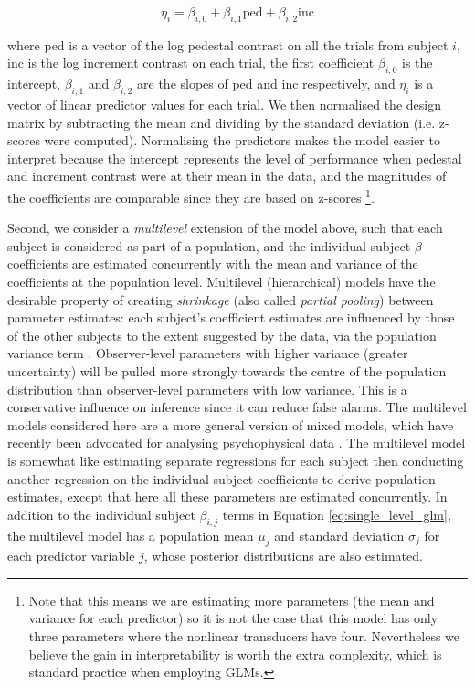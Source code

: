 \documentclass[11pt,a4paper]{article}
\begin{document}
\begin{equation}
\label{eq:single_level_glm}
\eta_{i} = \beta_{i,0} + \beta_{i,1} \mathrm{ped} + \beta_{i,2} \mathrm{inc}
\end{equation}

where ped is a vector of the log pedestal contrast on all the trials from subject $i$, inc is the log increment contrast on each trial, the first coefficient $\beta_{i,0}$ is the intercept, $\beta_{i,1}$ and $\beta_{i,2}$ are the slopes of ped and inc respectively,  and $\eta_{i}$ is a vector of linear predictor values for each trial.
We then normalised the design matrix by subtracting the mean and dividing by the standard deviation (i.e. z-scores were computed).
Normalising the predictors makes the model easier to interpret because the intercept represents the level of performance when pedestal and increment contrast were at their mean in the data, and the magnitudes of the coefficients are comparable since they are based on z-scores
\footnote{Note that this means we are estimating more parameters (the mean and variance for each predictor) so it is not the case that this model has only three parameters where the nonlinear transducers have four. Nevertheless we believe the gain in interpretability is worth the extra complexity, which is standard practice when employing GLMs.}.

Second, we consider a \textit{multilevel} extension of the model above, such that each subject is considered as part of a population, and the individual subject $\beta$ coefficients are estimated concurrently with the mean and variance of the coefficients at the population level.
Multilevel (hierarchical) models have the desirable property of creating \textit{shrinkage} (also called \textit{partial pooling}) between parameter estimates: each subject's coefficient estimates are influenced by those of the other subjects to the extent suggested by the data, via the population variance term \citep{Gelman2006a, Gelman2007, Kruschke2011a}.
Observer-level parameters with higher variance (greater uncertainty) will be pulled more strongly towards the centre of the population distribution than observer-level parameters with low variance.
This is a conservative influence on inference since it can reduce false alarms.
The multilevel models considered here are a more general version of mixed models, which have recently been advocated for analysing psychophysical data \cite{Moscatelli2012, Knoblauch2012}.
The multilevel model is somewhat like estimating separate regressions for each subject then conducting another regression on the individual subject coefficients to derive population estimates, except that here all these parameters are estimated concurrently.
In addition to the individual subject $\beta_{i,j}$ terms in Equation \ref{eq:single_level_glm}, the multilevel model has a population mean $\mu_j$ and standard deviation $\sigma_j$ for each predictor variable $j$, whose posterior distributions are also estimated.
\end{document}
